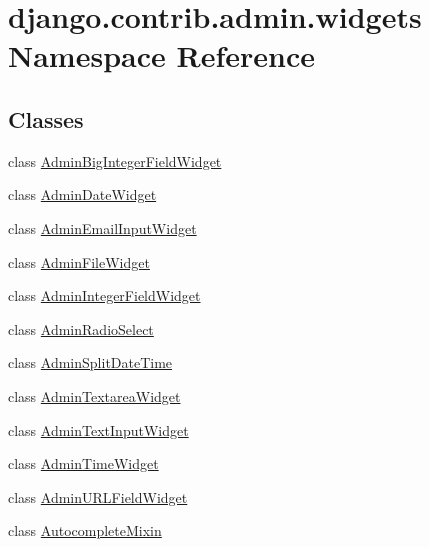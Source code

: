 \hypertarget{namespacedjango_1_1contrib_1_1admin_1_1widgets}{}\section{django.\+contrib.\+admin.\+widgets Namespace Reference}
\label{namespacedjango_1_1contrib_1_1admin_1_1widgets}
\subsection*{Classes}
\begin{DoxyCompactItemize}
\item 
class \mbox{\hyperlink{classdjango_1_1contrib_1_1admin_1_1widgets_1_1_admin_big_integer_field_widget}{Admin\+Big\+Integer\+Field\+Widget}}
\item 
class \mbox{\hyperlink{classdjango_1_1contrib_1_1admin_1_1widgets_1_1_admin_date_widget}{Admin\+Date\+Widget}}
\item 
class \mbox{\hyperlink{classdjango_1_1contrib_1_1admin_1_1widgets_1_1_admin_email_input_widget}{Admin\+Email\+Input\+Widget}}
\item 
class \mbox{\hyperlink{classdjango_1_1contrib_1_1admin_1_1widgets_1_1_admin_file_widget}{Admin\+File\+Widget}}
\item 
class \mbox{\hyperlink{classdjango_1_1contrib_1_1admin_1_1widgets_1_1_admin_integer_field_widget}{Admin\+Integer\+Field\+Widget}}
\item 
class \mbox{\hyperlink{classdjango_1_1contrib_1_1admin_1_1widgets_1_1_admin_radio_select}{Admin\+Radio\+Select}}
\item 
class \mbox{\hyperlink{classdjango_1_1contrib_1_1admin_1_1widgets_1_1_admin_split_date_time}{Admin\+Split\+Date\+Time}}
\item 
class \mbox{\hyperlink{classdjango_1_1contrib_1_1admin_1_1widgets_1_1_admin_textarea_widget}{Admin\+Textarea\+Widget}}
\item 
class \mbox{\hyperlink{classdjango_1_1contrib_1_1admin_1_1widgets_1_1_admin_text_input_widget}{Admin\+Text\+Input\+Widget}}
\item 
class \mbox{\hyperlink{classdjango_1_1contrib_1_1admin_1_1widgets_1_1_admin_time_widget}{Admin\+Time\+Widget}}
\item 
class \mbox{\hyperlink{classdjango_1_1contrib_1_1admin_1_1widgets_1_1_admin_u_r_l_field_widget}{Admin\+U\+R\+L\+Field\+Widget}}
\item 
class \mbox{\hyperlink{classdjango_1_1contrib_1_1admin_1_1widgets_1_1_autocomplete_mixin}{Autocomplete\+Mixin}}

\end{DoxyCompactItemize}
